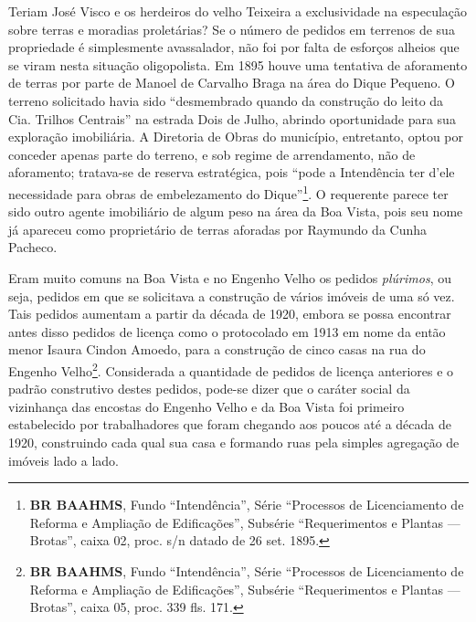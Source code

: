 
Teriam José Visco e os herdeiros do velho Teixeira a exclusividade na especulação sobre terras e moradias proletárias? Se o número de pedidos em terrenos de sua propriedade é simplesmente avassalador, não foi por falta de esforços alheios que se viram nesta situação oligopolista. Em 1895 houve uma tentativa de aforamento de terras por parte de Manoel de Carvalho Braga na área do Dique Pequeno. O terreno solicitado havia sido ``desmembrado quando da construção do leito da Cia. Trilhos Centrais'' na estrada Dois de Julho, abrindo oportunidade para sua exploração imobiliária. A Diretoria de Obras do município, entretanto, optou por conceder apenas parte do terreno, e sob regime de arrendamento, não de aforamento; tratava-se de reserva estratégica, pois ``pode a Intendência ter d'ele necessidade para obras de embelezamento do Dique''\footnote{\textbf{BR BAAHMS}, Fundo ``Intendência'', Série ``Processos de Licenciamento de Reforma e Ampliação de Edificações'', Subsérie ``Requerimentos e Plantas --- Brotas'', caixa 02, proc. s/n datado de 26 set. 1895.}. O requerente parece ter sido outro agente imobiliário de algum peso na área da Boa Vista, pois seu nome já apareceu como proprietário de terras aforadas por Raymundo da Cunha Pacheco.


Eram muito comuns na Boa Vista e no Engenho Velho os pedidos \textit{plúrimos}, ou seja, pedidos em que se solicitava a construção de vários imóveis de uma só vez. Tais pedidos aumentam a partir da década de 1920, embora se possa encontrar antes disso pedidos de licença como o protocolado em 1913 em nome da então menor Isaura Cindon Amoedo, para a construção de cinco casas na rua do Engenho Velho\footnote{\textbf{BR BAAHMS}, Fundo ``Intendência'', Série ``Processos de Licenciamento de Reforma e Ampliação de Edificações'', Subsérie ``Requerimentos e Plantas --- Brotas'', caixa 05, proc. 339 fls. 171.}. Considerada a quantidade de pedidos de licença anteriores e o padrão construtivo destes pedidos, pode-se dizer que o caráter social da vizinhança das encostas do Engenho Velho e da Boa Vista foi primeiro estabelecido por trabalhadores que foram chegando aos poucos até a década de 1920, construindo cada qual sua casa e formando ruas pela simples agregação de imóveis lado a lado. 

